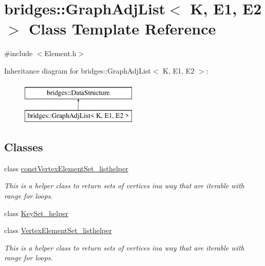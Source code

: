\hypertarget{classbridges_1_1_graph_adj_list}{}\section{bridges\+::Graph\+Adj\+List$<$ K, E1, E2 $>$ Class Template Reference}
\label{classbridges_1_1_graph_adj_list}


{\ttfamily \#include $<$Element.\+h$>$}

Inheritance diagram for bridges\+::Graph\+Adj\+List$<$ K, E1, E2 $>$\+:\begin{figure}[H]
\begin{center}
\leavevmode
\includegraphics[height=2.000000cm]{classbridges_1_1_graph_adj_list}
\end{center}
\end{figure}
\subsection*{Classes}
\begin{DoxyCompactItemize}
\item 
class \mbox{\hyperlink{classbridges_1_1_graph_adj_list_1_1const_vertex_element_set__listhelper}{const\+Vertex\+Element\+Set\+\_\+listhelper}}
\begin{DoxyCompactList}\small\item\em This is a helper class to return sets of vertices ina way that are iterable with range for loops. \end{DoxyCompactList}\item 
class \mbox{\hyperlink{classbridges_1_1_graph_adj_list_1_1_key_set__helper}{Key\+Set\+\_\+helper}}
\item 
class \mbox{\hyperlink{classbridges_1_1_graph_adj_list_1_1_vertex_element_set__listhelper}{Vertex\+Element\+Set\+\_\+listhelper}}
\begin{DoxyCompactList}\small\item\em This is a helper class to return sets of vertices ina way that are iterable with range for loops. \end{DoxyCompactList}\end{DoxyCompactItemize}
